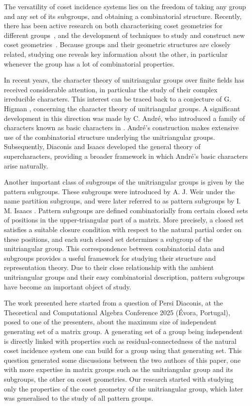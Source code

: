 \documentclass[11pt,letterpaper]{amsart}
\begin{document}
The versatility of coset incidence systems lies on the freedom of taking any group and any set of its subgroups, and obtaining a combinatorial structure. Recently, there has been active research on both characterising coset geometries for different groups~\cite{Tranchida2025,Remy2026, Fernandes2026, Leemans2025},
and the
development of techniques to study and construct new coset geometries~\cite{Zhang2026,Piedade2025, Piedade2026,wreathproductPiedadeTranchida}.
Because groups and their geometric structures are closely related, studying one reveals key information about the other, in particular whenever the group has a lot of combinatorial properties.


In recent years, the character theory of unitriangular groups over finite fields has received considerable attention, in particular the study of their complex irreducible characters. This interest can be traced back to a conjecture of G. Higman \cite{higman1960enumerating}, concerning the character theory of unitriangular groups. A significant development in this direction was made by C. André, who introduced a family of characters known as basic characters in \cite{andre1995basic}. André's construction makes extensive use of the combinatorial structure underlying the unitriangular groups. Subsequently, Diaconis and Isaacs \cite{diaconis2008supercharacters} developed the general theory of supercharacters, providing a broader framework in which André's basic characters arise naturally.

Another important class of subgroups of the unitriangular groups is given by the pattern subgroups. These subgroups were introduced by A. J. Weir \cite{weir1955sylow} under the name partition subgroups, and were later referred to as pattern subgroups by I. M. Isaacs \cite{isaacs2007counting}. Pattern subgroups are defined combinatorially from certain closed sets of positions in the upper-triangular part of a matrix. More precisely, a closed set satisfies a suitable closure condition with respect to the natural partial order on these positions, and each such closed set determines a subgroup of the unitriangular group. This correspondence between combinatorial data and subgroups provides a useful framework for studying their structure and representation theory.
Due to their close relationship with the ambient unitriangular groups and their easy combinatorial description, pattern subgroups have become an important object of study. 


The work presented here started from a question of Persi Diaconis, at the Theoretical and Computational Algebra Conference 2025 (Évora, Portugal), posed to one of the presenters, about the maximum size of independent generating set of a matrix group. A generating set of a group being independent is directly linked with properties such as residual-connectedness of the natural coset incidence system one can build for a group using that generating set. This question generated some discussions between the two authors of this paper, one with more expertise in matrix groups such as the unitriangular group and its subgroups, the other on coset geometries. Our research started with studying only the properties of the coset geometry of the unitriangular group, which later was generalised to the study of all pattern groups.
\end{document}
